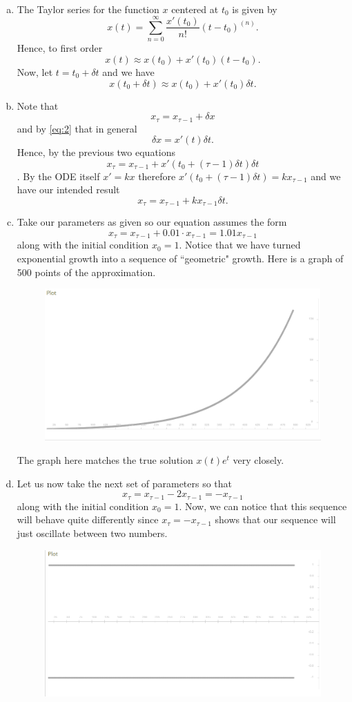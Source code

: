 \documentclass[12pt]{article} %
\begin{document}
\begin{solution}~
	\begin{enumerate}[(a)]
		\item The Taylor series for the function $x$ centered at $t_0$ is given by
		\[
		x(t) = \sum_{n=0}^\infty \frac{x'(t_0)}{n!}(t-t_0)^{(n)}.
		\]
		Hence, to first order
		\[ x(t) \approx x(t_0)+x'(t_0)(t-t_0).\]
		Now, let $t=t_0+\delta t$ and we have
		\[ \boxed{x(t_0+\delta t) \approx x(t_0)+x'(t_0)\delta t.}\]
		\item Note that
		\[ x_\tau = x_{\tau -1}+\delta x\]
		and by \cref{eq:2} that in general
		\[ \delta x = x'(t)\delta t.\]
		Hence, by the previous two equations
		\[ x_{\tau}=x_{\tau-1}+x'(t_0+(\tau -1)\delta t)\delta t\].
		By the ODE itself $x'=kx$ therefore $x'(t_0+(\tau -1)\delta t)=kx_{\tau -1}$ and we have our intended result
		\[\boxed{ x_\tau = x_{\tau -1}+kx_{\tau-1}\delta t.}\]
		\item Take our parameters as given so our equation assumes the form
		\[ x_\tau = x_{\tau-1} + 0.01\cdot x_{\tau-1}=1.01 x_{\tau-1}\]
		along with the initial condition $x_0 = 1$. Notice that we have turned exponential growth into a sequence of ``geometric" growth. Here is a graph of 500 points of the approximation.
		\begin{figure}[H]
			\centering
			\includegraphics[width=.75\textwidth]{explicit_euler_1.png}
		\end{figure}
		The graph here matches the true solution $x(t)e^t$ very closely.
		
		\item Let us now take the next set of parameters so that
		\[ x_\tau = x_{\tau-1} - 2 x_{\tau-1} = -x_{\tau-1}\]
		along with the initial condition $x_0=1$. Now, we can notice that this sequence will behave quite differently since $x_\tau = -x_{\tau-1}$ shows that our sequence will just oscillate between two numbers. 
				\begin{figure}[H]
			\centering
			\includegraphics[width=.75\textwidth]{explicit_euler_2.png}
		\end{figure}
	\end{enumerate}
\end{solution}
\end{document}
